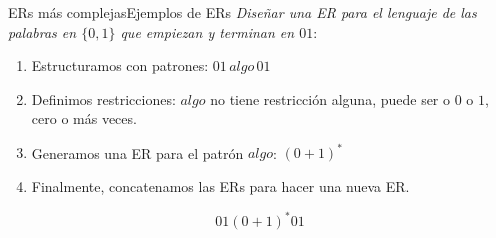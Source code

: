 \documentclass[spanish, handout]{beamer}
\begin{document}
\begin{frame}{ERs más complejas}{Ejemplos de ERs}
    \textit{Diseñar una ER para el lenguaje de las palabras en $\{0,1\}$ que empiezan y terminan en $01$}: \pause

    \bigskip

    \begin{enumerate}
        \item Estructuramos con patrones:
        $01 \, algo \, 01$ \pause 
        \item Definimos restricciones:
        $algo$ no tiene restricción alguna, puede ser o $0$ o $1$, cero o más veces.\pause
        \item Generamos una ER para el patrón $algo$:
        $(0 + 1)^*$ \pause
        \item Finalmente, concatenamos las ERs para hacer una nueva ER.
    \end{enumerate}

    \[01(0+1)^*01\]
\end{frame}



% 
% 
\end{document}

